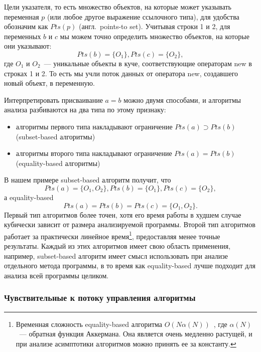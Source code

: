 \documentclass[14pt,titlepage,draft]{extarticle}
\newcommand{\eng}[1]{{\English#1}}
\newcommand{\engdef}[1]{(англ.~\eng{#1})}
\begin{document}
        Цели указателя, то есть множество объектов, на которые может указывать
        переменная $p$ (или любое другое выражение ссылочного типа), для
        удобства обозначим как $Pts(p)$ \engdef{points-to set}.
        Учитывая строки 1 и 2, для переменных $b$ и $c$ мы можем точно
        определить множество объектов, на которые они указывают:
        \[Pts(b) = \{O_1\}, Pts(c) = \{O_2\},\]
        где $O_1$ и $O_2$~--- уникальные объекты в куче, соответствующие
        операторам \eng{new} в строках 1 и 2.  То есть мы учли поток данных от
        оператора \eng{new}, создавшего новый объект, в переменную.

        Интерпретировать присваивание $a = b$ можно двумя способами,
        и алгоритмы анализа разбиваются на два типа по этому признаку:
        \begin{itemize}
          \item алгоритмы первого типа накладывают ограничение
                $Pts(a) \supset Pts(b)$
                (\eng{subset-based} алгоритмы)~\cite{andersen}
          \item алгоритмы второго типа накладывают ограничение
                $Pts(a) = Pts(b)$
                (\eng{equality-based} алгоритмы)~\cite{steensgaard}
        \end{itemize}
        В нашем примере \eng{subset-based} алгоритм получит, что
        \[Pts(a) = \{O_1, O_2\}, Pts(b) = \{O_1\}, Pts(c) = \{O_2\},\]
        а \eng{equality-based}
        \[Pts(a) = Pts(b) = Pts(c) = \{O_1, O_2\}.\]
        Первый тип алгоритмов более точен, хотя его время работы в худшем
        случае кубически зависит от размера анализируемой программы.
        Второй тип алгоритмов работает за практически линейное время\footnote{
          Временная сложность \eng{equality-based} алгоритма
          $O(N \alpha(N))$~\cite{steensgaard}, где $\alpha(N)$~--- обратная
          функция Аккермана. Она является очень медленно растущей, и при
          анализе асимптотики алгоритмов можно принять ее за константу.
        },
        предоставляя менее точные результаты.
        Каждый из этих алгоритмов имеет свою область применения, например,
        \eng{subset-based} алгоритм имеет смысл использовать при анализе
        отдельного метода программы, в то время как \eng{equality-based} лучше
        подходит для анализа всей программы целиком.


      \subsubsection{Чувствительные к потоку управления алгоритмы}
        \label{section:analysis_classification_control_flow}
\end{document}
